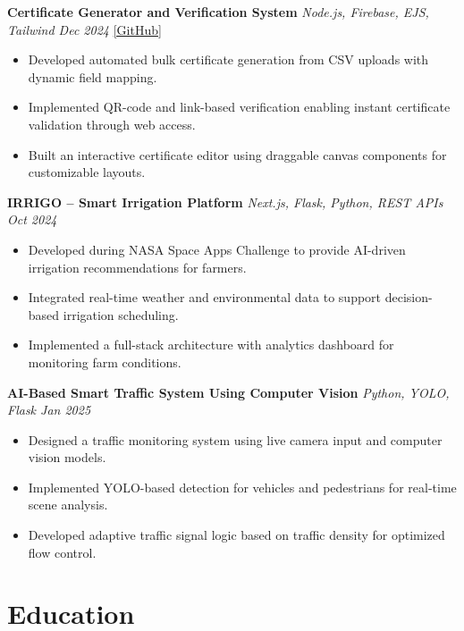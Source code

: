 \documentclass[10pt, a4paper]{article}
\begin{document}
\vspace{3pt}

\textbf{Certificate Generator and Verification System} \hfill \textit{Node.js, Firebase, EJS, Tailwind \quad Dec 2024} \quad \href{https://github.com/bbinxx/advanced-certificate-generator}{[GitHub]}
\begin{itemize}
\item Developed automated bulk certificate generation from CSV uploads with dynamic field mapping.
\item Implemented QR-code and link-based verification enabling instant certificate validation through web access.
\item Built an interactive certificate editor using draggable canvas components for customizable layouts.
\end{itemize}

\vspace{3pt}

\textbf{IRRIGO -- Smart Irrigation Platform} \hfill \textit{Next.js, Flask, Python, REST APIs \quad Oct 2024}
\begin{itemize}
\item Developed during NASA Space Apps Challenge to provide AI-driven irrigation recommendations for farmers.
\item Integrated real-time weather and environmental data to support decision-based irrigation scheduling.
\item Implemented a full-stack architecture with analytics dashboard for monitoring farm conditions.
\end{itemize}

\vspace{3pt}

\textbf{AI-Based Smart Traffic System Using Computer Vision} \hfill \textit{Python, YOLO, Flask \quad Jan 2025}
\begin{itemize}
\item Designed a traffic monitoring system using live camera input and computer vision models.
\item Implemented YOLO-based detection for vehicles and pedestrians for real-time scene analysis.
\item Developed adaptive traffic signal logic based on traffic density for optimized flow control.
\end{itemize}

\section*{Education}
\end{document}
